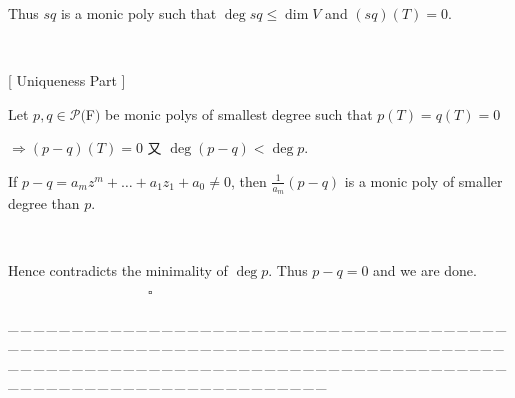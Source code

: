 \documentclass[a4paper, 11pt, UTF8]{article}
\def\Po{\mathcal{P}}
\begin{document}
\begin{large}
Thus $sq$ is a monic poly such that $\deg sq\leq \dim V$ and $(sq)(T) = 0$.\par{\tiny\,\par}\quad
{\Large[} {\timessl\large Uniqueness Part} {\Large]}\par\quad
Let $p,q\in\Po(${\timesbf F}$)$ be monic polys of smallest degree such that $p(T)=q(T) = 0$\par\qquad
$\Rightarrow (p-q)(T)=0$ 又 $\deg(p-q)<\deg p$.\par\quad
If $p - q=a_m z^m+\dots+a_1 z_1 +a_0\neq 0$, then $\displaystyle\frac{1}{a_m}(p-q)$ is a monic poly of smaller degree than $p$. \par{\tiny\,\par}\quad
Hence contradicts the minimality of $\deg p$. Thus $p-q=0$ and we are done.$\qquad\qquad\qquad\qquad\qquad\square$\par
{\tiny \_\,\_\,\_\,\_\,\_\,\_\,\_\,\_\,\_\,\_\,\_\,\_\,\_\,\_\,\_\,\_\,\_\,\_\,\_\,\_\,\_\,\_\,\_\,\_\,\_\,\_\,\_\,\_\,\_\,\_\,\_\,\_\,\_\,\_\,\_\,\_\,\_\,\_\,\_\,\_\,\_\,\_\,\_\,\_\,\_\,\_\,\_\,\_\,\_\,\_\,\_\,\_\,\_\,\_\,\_\,\_\,\_\,\_\,\_\,\_\,\_\,\_\,\_\,\_\,\_\,\_\,\_\,\_\,\_\,\_\,\_\_\,\_\,\_\,\_\,\_\,\_\,\_\,\_\,\_\,\_\,\_\,\_\,\_\,\_\,\_\,\_\,\_\,\_\,\_\,\_\,\_\,\_\,\_\,\_\,\_\,\_\,\_\,\_\,\_\,\_\,\_\,\_\,\_\,\_\,\_\,\_\,\_\,\_\,\_\,\_\,\_\,\_\,\_\,\_\,\_\,\_\,\_\,\_\,\_\,\_\,\_\,\_\,\_\,\_\,\_\,\_\,\_\,\_\,\_\,\_\,\_\,\_\,\_\,\_\,\_\,\_\,\_\,\_\,\_\,\_\,\_}{\tiny\,\par}


\end{large}
\end{document}
